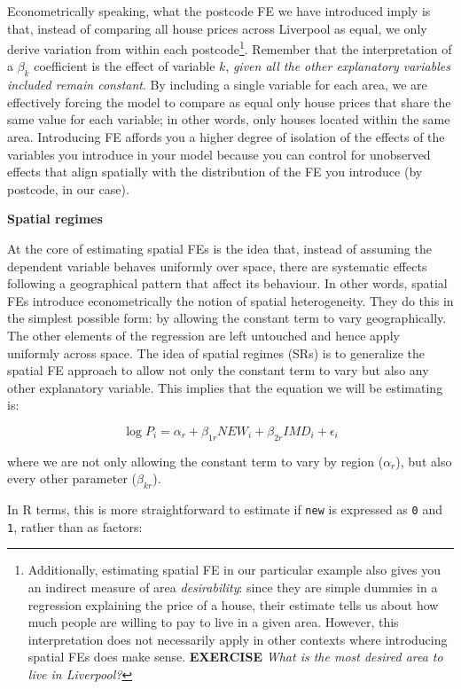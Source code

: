 \documentclass[]{book}
\begin{document}
Econometrically speaking, what the postcode FE we have introduced imply
is that, instead of comparing all house prices across Liverpool as
equal, we only derive variation from within each postcode\footnote{Additionally,
  estimating spatial FE in our particular example also gives you an
  indirect measure of area \emph{desirability}: since they are simple
  dummies in a regression explaining the price of a house, their
  estimate tells us about how much people are willing to pay to live in
  a given area. However, this interpretation does not necessarily apply
  in other contexts where introducing spatial FEs does make sense.
  \textbf{EXERCISE} \emph{What is the most desired area to live in
  Liverpool?}}. Remember that the interpretation of a \(\beta_k\)
coefficient is the effect of variable \(k\), \emph{given all the other
explanatory variables included remain constant}. By including a single
variable for each area, we are effectively forcing the model to compare
as equal only house prices that share the same value for each variable;
in other words, only houses located within the same area. Introducing FE
affords you a higher degree of isolation of the effects of the variables
you introduce in your model because you can control for unobserved
effects that align spatially with the distribution of the FE you
introduce (by postcode, in our case).

\textbf{Spatial regimes}

At the core of estimating spatial FEs is the idea that, instead of
assuming the dependent variable behaves uniformly over space, there are
systematic effects following a geographical pattern that affect its
behaviour. In other words, spatial FEs introduce econometrically the
notion of spatial heterogeneity. They do this in the simplest possible
form: by allowing the constant term to vary geographically. The other
elements of the regression are left untouched and hence apply uniformly
across space. The idea of spatial regimes (SRs) is to generalize the
spatial FE approach to allow not only the constant term to vary but also
any other explanatory variable. This implies that the equation we will
be estimating is:

\[
\log{P_i} = \alpha_r + \beta_{1r} NEW_i + \beta_{2r} IMD_i + \epsilon_i
\]

where we are not only allowing the constant term to vary by region
(\(\alpha_r\)), but also every other parameter (\(\beta_{kr}\)).

In R terms, this is more straightforward to estimate if \texttt{new} is
expressed as \texttt{0} and \texttt{1}, rather than as factors:
\end{document}
